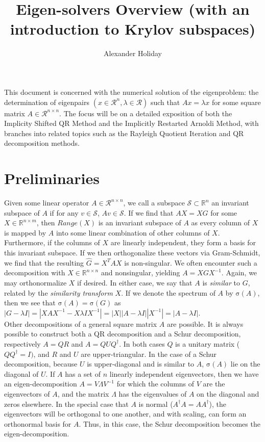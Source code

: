 \documentclass[11pt]{article}
\newcommand{\Rmn}[2]{\mathbb{R}^{#1 \times #2}}
\newcommand{\Rn}{\mathbb{R}^{n}}
\newcommand{\Rnn}{\mathbb{R}^{n \times n}}
\begin{document}
\title{\vspace{-10mm}Eigen-solvers Overview (with an introduction to Krylov subspaces)}
\author{Alexander Holiday}
\maketitle

This document is concerned with the numerical solution of the eigenproblem: the determination of eigenpairs $(x \in \mathcal{R}^{n}, \lambda \in \mathcal{R})$ such that $Ax = \lambda x$ for some square matrix $A \in \mathcal{R}^{n \times n}$. The focus will be on a detailed exposition of both the Implicity Shifted QR Method and the Implicitly Restarted Arnoldi Method, with branches into related topics such as the Rayleigh Quotient Iteration and QR decomposition methods.

\section{Preliminaries}

Given some linear operator $A \in \mathcal{R}^{n \times n}$, we call a subspace $\mathcal{S} \subset \Rn$ an invariant subspace of $A$ if for any $v \in \mathcal{S}$, $Av \in \mathcal{S}$. If we find that $AX = XG$ for some $X \in \Rmn{n}{m}$, then $Range(X)$ is an invariant subspace of $A$ as every column of $X$ is mapped by $A$ into some linear combination of other columns of $X$. Furthermore, if the columns of $X$ are linearly independent, they form a basis for this invariant subspace. If we then orthogonalize these vectors via Gram-Schmidt, we find that the resulting $\hat{G} = X^T A X$ is non-singular. We often encounter such a decomposition with $X \in \Rnn$ and nonsingular, yielding $A = X G X^{-1}$. Again, we may orthonormalize $X$ if desired. In either case, we say that $A$ is \textit{similar} to $G$, related by the \textit{similarity transform} $X$. If we denote the spectrum of $A$ by $\mathrm{\sigma}(A)$, then we see that $\mathrm{\sigma}(A) = \mathrm{\sigma}(G)$ as $| G - \lambda I | = | X A X^{-1} - X \lambda I X^{-1} | = |X| | A - \lambda I | | X^{-1} |  = | A - \lambda I |$. \\

Other decompositions of a general square matrix $A$ are possible. It is always possible to construct both a QR decomposition and a Schur decomposition, respectively $A = QR$ and $A = Q U Q^\dagger$. In both cases $Q$ is a unitary matrix ($Q Q^{\dagger} = I)$, and $R$ and $U$ are upper-triangular. In the case of a Schur decomposition, because $U$ is upper-diagonal and is similar to $A$, $\mathrm{\sigma}(A)$ lie on the diagonal of $U$. If $A$ has a set of $n$ linearly independent eigenvectors, then we have an eigen-decomposition $A = V \Lambda V^{-1}$ for which the columns of $V$ are the eigenvectors of $A$, and the matrix $\Lambda$ has the eigenvalues of $A$ on the diagonal and zeros elsewhere. In the special case that $A$ is normal ($A^\dagger A = A A^\dagger$), the eigenvectors will be orthogonal to one another, and with scaling, can form an orthonormal basis for $A$. Thus, in this case, the Schur decomposition becomes the eigen-decomposition. \\
\end{document}
